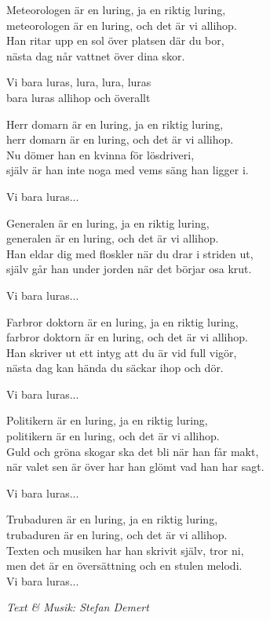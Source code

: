 \vspace{10pt}
Meteorologen är en luring, ja en riktig luring,\\
meteorologen är en luring, och det är vi allihop.\\
Han ritar upp en sol över platsen där du bor,\\
nästa dag når vattnet över dina skor.\par
\vspace{10pt}
Vi bara luras, lura, lura, luras\\
bara luras allihop och överallt\par
\vspace{10pt}
Herr domarn är en luring, ja en riktig luring,\\
herr domarn är en luring, och det är vi allihop.\\
Nu dömer han en kvinna för lösdriveri,\\
själv är han inte noga med vems säng han ligger i.\par
\vspace{10pt}
Vi bara luras...\par
\vspace{10pt}
Generalen är en luring, ja en riktig luring,\\
generalen är en luring, och det är vi allihop.\\
Han eldar dig med floskler när du drar i striden ut,\\
själv går han under jorden när det börjar osa krut.\par
\vspace{10pt}
Vi bara luras...\par
\vspace{10pt}
Farbror doktorn är en luring, ja en riktig luring,\\
farbror doktorn är en luring, och det är vi allihop.\\
Han skriver ut ett intyg att du är vid full vigör,\\
nästa dag kan hända du säckar ihop och dör.\par
\vspace{10pt}
Vi bara luras...\par
\newpage
Politikern är en luring, ja en riktig luring,\\
politikern är en luring, och det är vi allihop.\\
Guld och gröna skogar ska det bli när han får makt,\\
när valet sen är över har han glömt vad han har sagt.\par
\vspace{10pt}
Vi bara luras...\par
\vspace{10pt}
Trubaduren är en luring, ja en riktig luring,\\
trubaduren är en luring, och det är vi allihop.\\
Texten och musiken har han skrivit själv, tror ni,\\
men det är en översättning och en stulen melodi.\\
Vi bara luras...\par
\vspace{10pt}
{\footnotesize\textit{Text \& Musik: Stefan Demert}}
